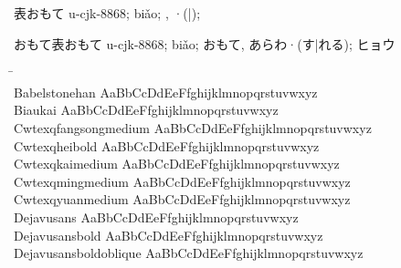 
{表{\hi{}お}{\hi{}も}{\hi{}て}} u-cjk-8868; biǎo; {}, {}{\mktsFontfileEbgaramondtwelveregular{}·}({}|{}); {}

{\mktsFontfileIpamp{}おもて表おもて u-cjk-8868; biǎo; おもて, あらわ·(す|れる); ヒョウ}

\begin{tabbing}
\phantom{XXXXXXXXXXXXXXXXXXXXXXXXX} \= \phantom{XXXXXXXXXXXXXXXXXXXXXXXXXXXXXXXXXXXXXXXXXXXXXXXXXXXXXXXXXXXX} \\
Babelstonehan \> { AaBbCcDdEeFfghijklmnopqrstuvwxyz} \\
Biaukai \> { AaBbCcDdEeFfghijklmnopqrstuvwxyz} \\
Cwtexqfangsongmedium \> { AaBbCcDdEeFfghijklmnopqrstuvwxyz} \\
Cwtexqheibold \> { AaBbCcDdEeFfghijklmnopqrstuvwxyz} \\
Cwtexqkaimedium \> { AaBbCcDdEeFfghijklmnopqrstuvwxyz} \\
Cwtexqmingmedium \> { AaBbCcDdEeFfghijklmnopqrstuvwxyz} \\
Cwtexqyuanmedium \> { AaBbCcDdEeFfghijklmnopqrstuvwxyz} \\
Dejavusans \> { AaBbCcDdEeFfghijklmnopqrstuvwxyz} \\
Dejavusansbold \> { AaBbCcDdEeFfghijklmnopqrstuvwxyz} \\
Dejavusansboldoblique \> { AaBbCcDdEeFfghijklmnopqrstuvwxyz} \\

\end{tabbing}
